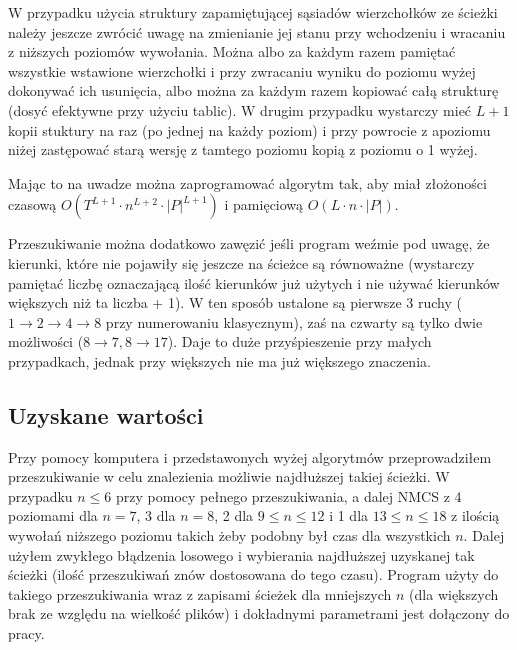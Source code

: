 \documentclass{pracamgr}
\begin{document}
     W przypadku użycia struktury zapamiętującej sąsiadów wierzchołków ze ścieżki należy jeszcze zwrócić uwagę na zmienianie jej stanu przy wchodzeniu
     i wracaniu z niższych poziomów wywołania. Można albo za każdym razem pamiętać wszystkie wstawione wierzchołki i przy zwracaniu wyniku
     do poziomu wyżej dokonywać ich usunięcia, albo można za każdym razem kopiować całą strukturę (dosyć efektywne przy użyciu tablic).
     W drugim przypadku wystarczy mieć $L+1$ kopii stuktury na raz (po jednej na każdy poziom) i przy powrocie z apoziomu niżej
     zastępować starą wersję z tamtego poziomu kopią z poziomu o 1 wyżej.
     
     Mając to na uwadze można zaprogramować algorytm tak, aby miał złożoności czasową $O(T^{L+1}\cdot n^{L+2}\cdot|P|^{L+1})$
     i pamięciową $O(L\cdot n\cdot |P|)$.\newline
     
     Przeszukiwanie można dodatkowo zawęzić jeśli program weźmie pod uwagę, że kierunki, które nie pojawiły się jeszcze na ścieżce są równoważne
     (wystarczy pamiętać liczbę oznaczającą ilość kierunków już użytych i nie używać kierunków większych niż ta liczba + 1).
     W ten sposób ustalone są pierwsze 3 ruchy ($1\rightarrow2\rightarrow4\rightarrow8$ przy numerowaniu klasycznym),
     zaś na czwarty są tylko dwie możliwości ($8\rightarrow7,8\rightarrow17$). Daje to duże przyśpieszenie przy małych przypadkach,
     jednak przy większych nie ma już większego znaczenia.
    \subsection{Uzyskane wartości}
     Przy pomocy komputera i przedstawonych wyżej algorytmów przeprowadziłem przeszukiwanie w celu znalezienia możliwie najdłuższej takiej ścieżki.
     W przypadku $n\le6$ przy pomocy pełnego przeszukiwania, a dalej NMCS z 4 poziomami dla $n=7$, 3 dla $n=8$, 2 dla $9\le n\le12$ i 1 dla $13\le n\le18$
     z ilością wywołań niższego poziomu takich żeby podobny był czas dla wszystkich $n$. Dalej użyłem zwykłego błądzenia losowego i wybierania najdłuższej
     uzyskanej tak ścieżki (ilość przeszukiwań znów dostosowana do tego czasu).
     Program użyty do takiego przeszukiwania wraz z zapisami ścieżek dla mniejszych $n$ (dla większych brak ze względu na wielkość plików)
     i dokładnymi parametrami jest dołączony do pracy.\newline
     
\end{document}
